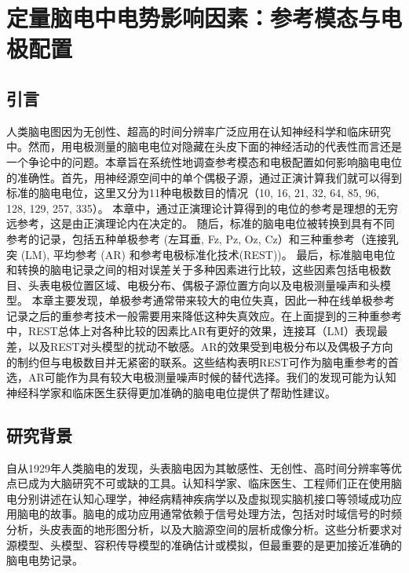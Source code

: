 \chapter{定量脑电中电势影响因素：参考模态与电极配置}
\section{引言}
人类脑电图因为无创性、超高的时间分辨率广泛应用在认知神经科学和临床研究中。然而，用电极测量的脑电电位对隐藏在头皮下面的神经活动的代表性而言还是一个争论中的问题。本章旨在系统性地调查参考模态和电极配置如何影响脑电电位的准确性。首先，用神经源空间中的单个偶极子源，通过正演计算我们就可以得到标准的脑电电位，这里又分为11种电极数目的情况（10, 16, 21, 32, 64, 85, 96, 128, 129, 257, 335）。 本章中，通过正演理论计算得到的电位的参考是理想的无穷远参考，这是由正演理论内在决定的。 随后，标准的脑电电位被转换到具有不同参考的记录，包括五种单极参考 (左耳垂, Fz, Pz, Oz, Cz）和三种重参考（连接乳突 (LM), 平均参考 (AR) 和参考电极标准化技术(REST))。 最后，标准脑电电位和转换的脑电记录之间的相对误差关于多种因素进行比较，这些因素包括电极数目、头表电极位置区域、电极分布、偶极子源位置方向以及电极测量噪声和头模型。 本章主要发现，单极参考通常带来较大的电位失真，因此一种在线单极参考记录之后的重参考技术一般需要用来降低这种失真效应。在上面提到的三种重参考中，REST总体上对各种比较的因素比AR有更好的效果，连接耳（LM）表现最差，以及REST对头模型的扰动不敏感。AR的效果受到电极分布以及偶极子方向的制约但与电极数目并无紧密的联系。这些结构表明REST可作为脑电重参考的首选，AR可能作为具有较大电极测量噪声时候的替代选择。我们的发现可能为认知神经科学家和临床医生获得更加准确的脑电电位提供了帮助性建议。

\section{研究背景}
自从1929年人类脑电的发现，头表脑电因为其敏感性、无创性、高时间分辨率等优点已成为大脑研究不可或缺的工具。认知科学家、临床医生、工程师们正在使用脑电分别讲述在认知心理学，神经病精神疾病学以及虚拟现实脑机接口等领域成功应用脑电的故事。脑电的成功应用通常依赖于信号处理方法，包括对时域信号的时频分析，头皮表面的地形图分析，以及大脑源空间的层析成像分析。这些分析要求对源模型、头模型、容积传导模型的准确估计或模拟，但最重要的是更加接近准确的脑电电势记录。

